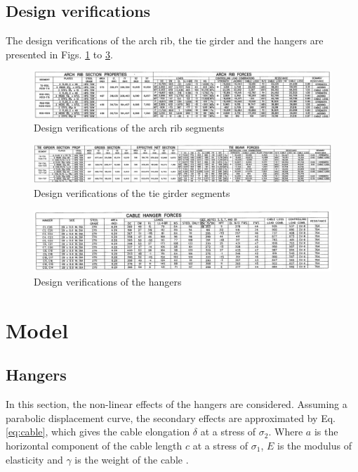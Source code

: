 \section{Design verifications} \label{app:design_verifications}
The design verifications of the arch rib, the tie girder and the hangers are presented in Figs. \ref{fig:arch_design_verification} to \ref{fig:hanger_design_verification}.
\begin{figure}[H]
    \centering
    \includegraphics[width=\textwidth]{overleaf/Appendix/Design drawings/arch rib verifications.PNG}
    \caption{Design verifications of the arch rib segments}
    \label{fig:arch_design_verification}
\end{figure}
\begin{figure}[H]
    \centering
    \includegraphics[width=\textwidth]{overleaf/Appendix/Design drawings/tie girder verifications.PNG}
    \caption{Design verifications of the tie girder segments}
    \label{fig:tie_design_verification}
\end{figure}
\begin{figure}[H]
    \centering
    \includegraphics[width=\textwidth]{overleaf/Appendix/Design drawings/cable verifications.PNG}
    \caption{Design verifications of the hangers}
    \label{fig:hanger_design_verification}
\end{figure}



\newpage
\chapter{Model}
\label{AppendixModel}
\section{Hangers}
\label{Appendix_A_Hangers}
In this section, the non-linear effects of the hangers are considered. Assuming a parabolic displacement curve, the secondary effects are approximated by Eq. \eqref{eq:cable}, which gives the cable elongation $\delta$ at a stress of $\sigma_2$. Where $a$ is the horizontal component of the cable length $c$ at a stress of $\sigma_1$, $E$ is the modulus of elasticity and $\gamma$ is the weight of the cable \cite{NIELS}. 

